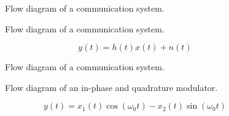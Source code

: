 \begin{figure}[h]
	\centering
	
	\caption{Flow diagram of a communication system.}
\end{figure}

\begin{figure}[h]
	\centering
	
	\caption{Flow diagram of a communication system.}
\end{figure}
\begin{equation}
	y(t)
	=
	h(t)x(t)
	+
	n(t)
\end{equation}

\begin{figure}[h]
	\centering
	
	\caption{Flow diagram of a communication system.}
\end{figure}

\begin{figure}[h]
	\centering
	
	\caption{Flow diagram of an in-phase and quadrature modulator.}
\end{figure}
\begin{equation}
	y(t)
	=
	x_1(t)
	\cos(\omega_0t)
	-
	x_2(t)
	\sin(\omega_0t)
\end{equation}